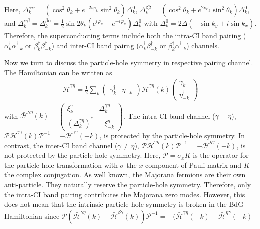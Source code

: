 \documentclass[12pt]{iopart}
\begin{document}
Here, $\Delta _{k}^{\alpha\alpha}= \left( \cos ^{2}\theta
_{k}+e^{-2i\varphi _{k}}\sin ^{2}\theta _{k}\right) \Delta
_{k}^{0}$, $%
\Delta _{k}^{\beta\beta}= \left( \cos ^{2}\theta
_{k}+e^{2i\varphi _{k}}\sin ^{2}\theta _{k}\right) \Delta
_{k}^{0}$, and $%
\Delta _{k}^{\alpha\beta}=\Delta _{k}^{\beta\alpha}=\frac{1}{2}\sin
2\theta _{k}\left( e^{i\varphi _{k}}-e^{-i\varphi _{k}}\right) \Delta
_{k}^{0}$ with $\Delta^{0}_{k}=2\Delta(-\sin k_{y}+i\sin k_{x})$. Therefore, the superconducting terms include both the intra-CI band pairing (%
$\alpha_{k}^{\dagger}\alpha_{-k}^{\dagger}$ or $\beta_{k}^{\dagger}\beta%
_{-k}^{\dagger}$) and inter-CI band pairng ($\alpha_{k}^{\dagger}\beta%
_{-k}^{\dagger}$ or $\beta_{k}^{\dagger}\alpha_{-k}^{\dagger}$) channels.

Now we turn to discuss the particle-hole symmetry in respective pairing channel. The Hamiltonian can be written as
 \begin{eqnarray}
\bar{\mathcal{H}}^{\gamma\eta}=\frac{1}{2}\sum_{k}\left(
\begin{array}{cc}
\gamma_{k}^{\dag } & \eta_{-k}%
\end{array}%
\right) \bar{\mathcal{H}}^{\gamma\eta}(k)\left(
\begin{array}{c}
\gamma _{k} \\
\eta _{-k}^{\dag }%
\end{array}%
\right)
\end{eqnarray} with $\bar{\mathcal{H}}^{\gamma\eta}(k) =\left(
\begin{array}{cc}
\xi _{k}^{\gamma} & \Delta _{k}^{\gamma \eta } \\
\left( \Delta _{k}^{\gamma \eta }\right) ^{\ast } & -\xi _{-k}^{\eta }%
\end{array}%
\right)$. The intra-CI band channel ($\gamma=\eta$), $\mathcal{P}\bar{\mathcal{H}}^{\gamma\gamma}(k)\mathcal{P}^{-1}=-\bar{\mathcal{H}}^{\gamma\gamma}(-k)$, is protected by the particle-hole symmetry. In contrast, the inter-CI band channel ($\gamma\ne\eta$), $\mathcal{P}\bar{\mathcal{H}}^{\gamma\eta}(k)\mathcal{P}^{-1}=-\bar{\mathcal{H}}^{\eta\gamma}(-k)$, is not protected by the particle-hole symmetry. Here, $\mathcal{P}=\sigma_{x}K$ is the operator for the particle-hole transformation with $\sigma$ the $x$-component of Pauli matrix and $K$ the complex conjugation. As well known, the Majorana fermions are their own anti-particle. They naturally reserve the particle-hole symmetry. Therefore, only the intra-CI band pairing contributes the Majorana zero modes. However, this does not mean that the intrinsic particle-hole symmetry is broken in the BdG Hamiltonian since $\mathcal{P}(\bar{\mathcal{H}}^{\gamma\eta}(k)+\bar{\mathcal{H}}^{\beta\gamma}(k))\mathcal{P}^{-1}=-(\bar{\mathcal{H}}^{\gamma\eta}(-k)+\bar{\mathcal{H}}^{\eta\gamma}(-k)$
\end{document}
